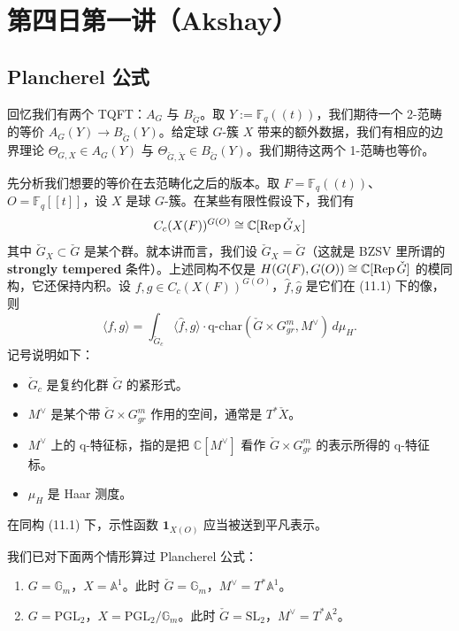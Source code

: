 \section{第四日第一讲（Akshay）}

\subsection{Plancherel 公式}

回忆我们有两个 TQFT：$A_G$ 与 $B_{\check G}$。取 $Y:=\mathbb F_q((t))$，我们期待一个 2-范畴的等价 $A_G(Y)\to B_{\check G}(Y)$。给定球 $G$-簇 $X$ 带来的额外数据，我们有相应的边界理论 $\Theta_{G,X}\in A_G(Y)$ 与 $\Theta_{\check G,\check X}\in B_{\check G}(Y)$。我们期待这两个 1-范畴也等价。

先分析我们想要的等价在去范畴化之后的版本。取 $F=\mathbb F_q((t))$、$O=\mathbb F_q[[t]]$，设 $X$ 是球 $G$-簇。在某些有限性假设下，我们有
\begin{equation}
  C_c(X(F))^{G(O)}\cong\mathbb C[\operatorname{Rep}\check G_X]
  \label{eq:11-1}
\end{equation}
其中 $\check G_X\subset\check G$ 是某个群。就本讲而言，我们设 $\check G_X=\check G$（这就是 BZSV 里所谓的 \textbf{strongly tempered} 条件）。上述同构不仅是 $H(G(F),G(O))\cong\mathbb C[\operatorname{Rep}\check G]$ 的模同构，它还保持内积。设 $f,g\in C_c(X(F))^{G(O)}$，$\hat f,\hat g$ 是它们在 (11.1) 下的像，则
\begin{equation}
  \langle f,g\rangle=\int_{\check G_c}\langle\hat f,\hat g\rangle\cdot\mathrm{q\text{-}char}(\check G\times G_{gr}^m,M^\vee)\,d\mu_H.
  \label{eq:11-2}
\end{equation}
记号说明如下：

\begin{itemize}[leftmargin=1.6em]
  \item $\check G_c$ 是复约化群 $\check G$ 的紧形式。
  \item $M^\vee$ 是某个带 $\check G\times G_{gr}^m$ 作用的空间，通常是 $T^*\check X$。
  \item $M^\vee$ 上的 q-特征标，指的是把 $\mathbb C[M^\vee]$ 看作 $\check G\times G_{gr}^m$ 的表示所得的 q-特征标。
  \item $\mu_H$ 是 Haar 测度。
\end{itemize}

在同构 (11.1) 下，示性函数 $\mathbf 1_{X(O)}$ 应当被送到平凡表示。

\begin{exmp}
我们已对下面两个情形算过 Plancherel 公式：
\begin{enumerate}[label=(\arabic*),leftmargin=1.8em]
  \item $G=\mathbb G_m$，$X=\mathbb A^1$。此时 $\check G=\mathbb G_m$，$M^\vee=T^*\mathbb A^1$。
  \item $G=\mathrm{PGL}_2$，$X=\mathrm{PGL}_2/\mathbb G_m$。此时 $\check G=\mathrm{SL}_2$，$M^\vee=T^*\mathbb A^2$。
\end{enumerate}
\end{exmp}

